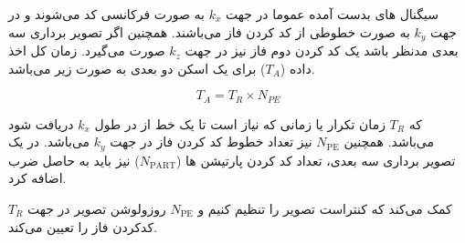 \begin{figure}[t!]
\begin{RTLcopyrightBox}{\linewidth}{}
{			\label{subfig:kspace-full-fov-lower-res}}
		\hfill
		\hfill
	\end{RTLcopyrightBox}
	\removevspace
	\caption{}
	\label{fig:kspace-fov-res}
\end{figure}







سیگنال های بدست آمده عموما در جهت $k_x$ به صورت فرکانسی کد می‌شوند و در جهت $k_y$ به صورت خطوطی از کد کردن فاز می‌باشند. همچنین اگر تصویر برداری سه بعدی مدنظر باشد یک کد کردن دوم فاز نیز در جهت $k_z$ صورت می‌گیرد. زمان کل اخذ داده
($T_A$)
برای یک اسکن دو بعدی به صورت زیر می‌باشد.

\removevspace
\begin{equation}
T_A = T_R \times N_{PE}
\end{equation}

که $T_R$ زمان تکرار
یا زمانی که نیاز است تا یک خط از \kspace در طول $k_x$ دریافت شود می‌باشد. همچنین $N_{\mathrm{PE}}$ نیز تعداد خطوط کد کردن فاز در جهت $k_y$ می‌باشد. در یک تصویر برداری سه بعدی، تعداد کد کردن پارتیشن ها
($N_{\mathrm{PART}}$)
نیز باید به حاصل ضرب اضافه کرد.

$T_R$
کمک می‌کند که کنتراست تصویر را تنظیم کنیم و $N_{\mathrm{PE}}$
روزولوشن تصویر در جهت کدکردن فاز را تعیین می‌کند.

